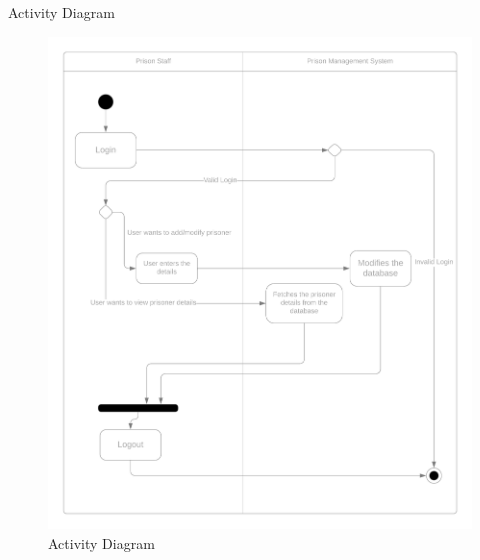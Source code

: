 \documentclass[aspectratio=169]{beamer}
\begin{document}
\begin{frame}{Activity Diagram}
    \begin{figure}
        \centering
        \includegraphics[scale=0.05]{activity.png}
        \caption{Activity Diagram}
        \label{fig:activity}
    \end{figure}
\end{frame}
\end{document}
